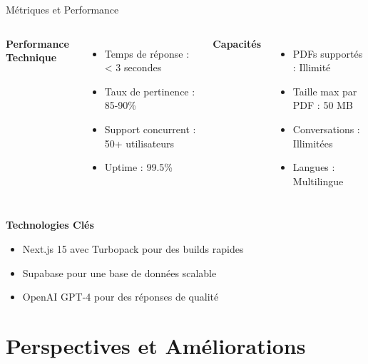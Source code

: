 \documentclass[aspectratio=169]{beamer}
\begin{document}
\begin{frame}{Métriques et Performance}
    \begin{columns}
        \textbf{Performance Technique}
        \begin{itemize}
            \item Temps de réponse : \textcolor{primaryblue}{< 3 secondes}
            \item Taux de pertinence : \textcolor{primaryblue}{85-90\%}
            \item Support concurrent : \textcolor{primaryblue}{50+ utilisateurs}
            \item Uptime : \textcolor{primaryblue}{99.5\%}
        \end{itemize}
        
        \textbf{Capacités}
        \begin{itemize}
            \item PDFs supportés : \textcolor{secondarypurple}{Illimité}
            \item Taille max par PDF : \textcolor{secondarypurple}{50 MB}
            \item Conversations : \textcolor{secondarypurple}{Illimitées}
            \item Langues : \textcolor{secondarypurple}{Multilingue}
        \end{itemize}
    \end{columns}
    
    \vspace{1cm}
    
    \textbf{Technologies Clés}
    \begin{itemize}
        \item Next.js 15 avec Turbopack pour des builds rapides
        \item Supabase pour une base de données scalable
        \item OpenAI GPT-4 pour des réponses de qualité
    \end{itemize}
\end{frame}

\section{Perspectives et Améliorations}
\end{document}
